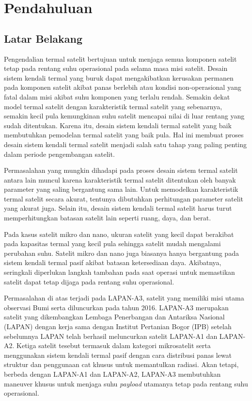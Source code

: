 \chapter{Pendahuluan}

\section{Latar Belakang}

Pengendalian termal satelit bertujuan untuk menjaga semua komponen satelit
tetap pada rentang suhu operasional pada selama masa misi satelit. Desain
sistem kendali termal yang buruk dapat mengakibatkan kerusakan permanen pada
komponen satelit akibat panas berlebih atau kondisi non-operasional yang fatal
dalam misi akibat suhu komponen yang terlalu rendah. Semakin dekat model termal
satelit dengan karakteristik termal satelit yang sebenarnya, semakin kecil pula
kemungkinan suhu satelit mencapai nilai di luar rentang yang sudah ditentukan.
Karena itu, desain sistem kendali termal satelit yang baik membutuhkan
pemodelan termal satelit yang baik pula. Hal ini membuat proses desain sistem
kendali termal satelit menjadi salah satu tahap yang paling penting dalam
periode pengembangan satelit.

Permasalahan yang mungkin dihadapi pada proses desain sistem termal satelit
antara lain muncul karena karakteristik termal satelit ditentukan oleh banyak
parameter yang saling bergantung sama lain. Untuk memodelkan karakteristik
termal satelit secara akurat, tentunya dibutuhkan perhitungan parameter satelit
yang akurat juga. Selain itu, desain sistem kendali termal satelit harus turut
memperhitungkan batasan satelit lain seperti ruang, daya, dan berat.

Pada kasus satelit mikro dan nano, ukuran satelit yang kecil dapat berakibat
pada kapasitas termal yang kecil pula sehingga satelit mudah mengalami
perubahan suhu. Satelit mikro dan nano juga biasanya hanya bergantung pada
sistem kendali termal pasif akibat batasan ketersediaan daya. Akibatnya,
seringkali diperlukan langkah tambahan pada saat operasi untuk memastikan
satelit dapat tetap dijaga pada rentang suhu operasional. 

Permasalahan di atas terjadi pada LAPAN-A3, satelit yang memiliki misi utama
observasi Bumi serta diluncurkan pada tahun 2016. LAPAN-A3 merupakan satelit
yang dikembangkan Lembaga Penerbangan dan Antariksa Nasional (LAPAN) dengan
kerja sama dengan Institut Pertanian Bogor (IPB) setelah sebelumnya LAPAN telah
berhasil meluncurkan satelit LAPAN-A1 dan LAPAN-A2. Ketiga satelit tesebut
termasuk dalam kategori mikrosatelit serta menggunakan sistem kendali termal
pasif dengan cara distribusi panas lewat struktur dan penggunaan cat khusus
untuk memantulkan radiasi. Akan tetapi, berbeda dengan LAPAN-A1 dan LAPAN-A2,
LAPAN-A3 membutuhkan maneuver khusus untuk menjaga suhu \textit{payload}
utamanya tetap pada rentang suhu operasional.

